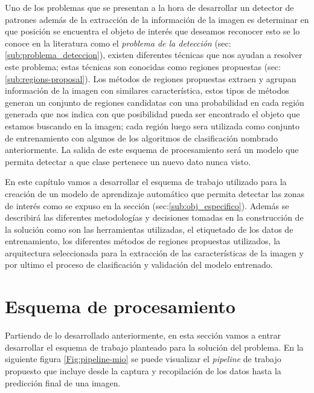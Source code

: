 Uno de los problemas que se presentan a la hora de desarrollar un detector de patrones además de la extracción de la información de la imagen es determinar en que posición se encuentra el objeto de interés que deseamos reconocer esto se lo conoce en la literatura como el \textit{problema de la detección} (sec:\ref{sub:problema_deteccion}), existen diferentes técnicas que nos ayudan a resolver este problema; estas técnicas son conocidas como regiones propuestas (sec:\ref{sub:regions-proposal}). Los métodos de regiones propuestas extraen y agrupan información de la imagen con similares característica, estos tipos de métodos generan un conjunto de regiones candidatas con una probabilidad en cada región generada que nos indica con que posibilidad pueda ser encontrado el objeto que estamos buscando en la imagen; cada región luego sera utilizada como conjunto de entrenamiento con algunos de los algoritmos de clasificación nombrado anteriormente. La salida de este esquema de procesamiento será un modelo que permita detectar a que clase pertenece un nuevo dato nunca visto.

En este capítulo vamos a desarrollar el esquema de trabajo utilizado para la creación de un modelo de aprendizaje automático que permita detectar las zonas de interés como se expuso en la sección (sec:\ref{sub:obj_especifico}). Además se describirá las diferentes metodologías y decisiones tomadas en la construcción de la solución como son las herramientas utilizadas, el etiquetado de los datos de entrenamiento, los diferentes  métodos de regiones propuestas utilizados, la arquitectura seleccionada para la extracción de las características de la imagen y por ultimo el proceso de clasificación y validación del modelo entrenado.




%


\section{Esquema de procesamiento}\label{sec: pipeline}

Partiendo de lo desarrollado anteriormente, en esta sección vamos a entrar desarrollar el esquema de trabajo planteado para la solución del problema. En la siguiente figura \ref{Fig:pipeline-mio} se puede visualizar el \textit{pipeline} de trabajo propuesto que incluye desde la captura y recopilación de los datos hasta la predicción final de una imagen.

